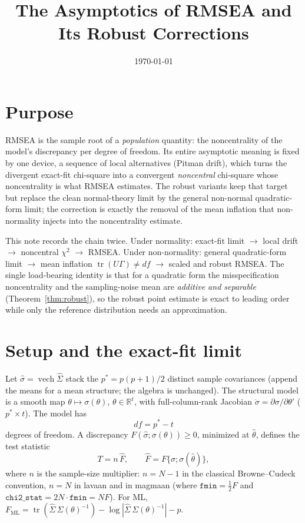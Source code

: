 \documentclass[11pt]{article}
\title{The Asymptotics of RMSEA and Its Robust Corrections}
\author{}
\date{\today}
\newcommand{\tr}{\operatorname{tr}}
\newcommand{\vech}{\operatorname{vech}}
\theoremstyle{plain}
\theoremstyle{remark}
\begin{document}
\maketitle

\section*{Purpose}

RMSEA is the sample root of a \emph{population} quantity: the noncentrality of
the model's discrepancy per degree of freedom. Its entire asymptotic meaning is
fixed by one device, a sequence of local alternatives (Pitman drift), which
turns the divergent exact-fit chi-square into a convergent \emph{noncentral}
chi-square whose noncentrality is what RMSEA estimates. The robust variants
keep that target but replace the clean normal-theory limit by the general
non-normal quadratic-form limit; the correction is exactly the removal of the
mean inflation that non-normality injects into the noncentrality estimate.

This note records the chain twice. Under normality:
exact-fit limit $\to$ local drift $\to$ noncentral $\chi^2$ $\to$ RMSEA. Under
non-normality: general quadratic-form limit $\to$ mean inflation
$\tr(U\Gamma)\ne df$ $\to$ scaled and robust RMSEA. The single load-bearing
identity is that for a quadratic form the misspecification noncentrality and the
sampling-noise mean are \emph{additive and separable} (Theorem~\ref{thm:robust}),
so the robust point estimate is exact to leading order while only the reference
distribution needs an approximation.

\section{Setup and the exact-fit limit}

Let $\hat\sigma=\vech\hat\Sigma$ stack the $p^\ast=p(p{+}1)/2$ distinct sample
covariances (append the means for a mean structure; the algebra is unchanged).
The structural model is a smooth map $\theta\mapsto\sigma(\theta)$,
$\theta\in\mathbb{R}^t$, with full-column-rank Jacobian
$\dot\sigma=\partial\sigma/\partial\theta'$ ($p^\ast\times t$). The model has
\[
  df = p^\ast - t
\]
degrees of freedom. A discrepancy $F(\hat\sigma;\sigma(\theta))\ge0$, minimized
at $\hat\theta$, defines the test statistic
\[
  T = n\,\hat F, \qquad \hat F = F\{\hat\sigma;\sigma(\hat\theta)\},
\]
where $n$ is the sample-size multiplier: $n=N-1$ in the classical
Browne--Cudeck convention, $n=N$ in lavaan and in magmaan (where
$\texttt{fmin}=\tfrac12 F$ and $\texttt{chi2\_stat}=2N\cdot\texttt{fmin}=N F$).
For ML, $F_{\mathrm{ML}}=\tr(\hat\Sigma\,\Sigma(\theta)^{-1})-\log|\hat\Sigma\,\Sigma(\theta)^{-1}|-p$.
\end{document}
